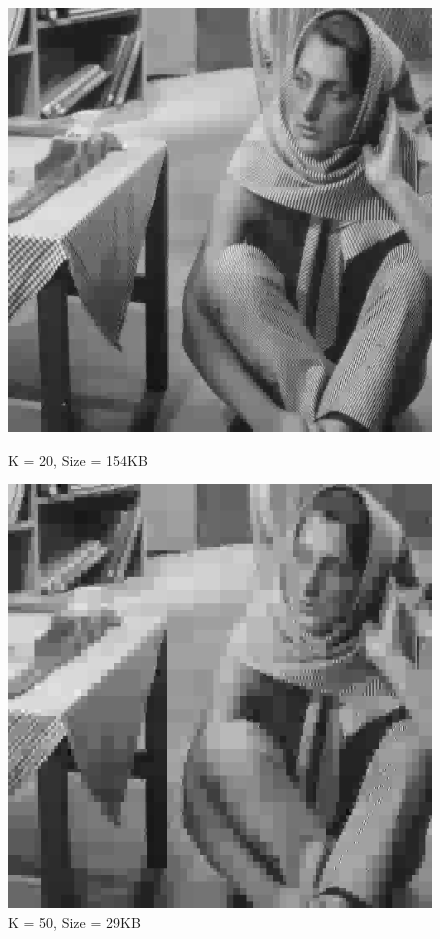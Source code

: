\documentclass{article}
\begin{document}
    \begin{figure}[!htb]
      \includegraphics[scale=0.4]{./compression/1/20.png}
      \caption{K = 20, Size = 154KB}
    \endminipage \hfill
      \includegraphics[scale=.4]{./compression/1/50.png}
      \caption{K = 50, Size = 29KB}
    \endminipage
    \end{figure}
    
\end{document}
